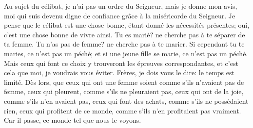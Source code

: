 Au sujet du célibat, je n’ai pas un ordre du Seigneur, mais je donne mon avis,
	moi qui suis devenu digne de confiance grâce à la miséricorde du Seigneur.
Je pense que le célibat est une chose bonne, étant donné les nécessités présentes;
	oui, c’est une chose bonne de vivre ainsi.
Tu es marié?
	ne cherche pas à te séparer de ta femme.
Tu n’as pas de femme?
	ne cherche pas à te marier.
Si cependant tu te maries, ce n’est pas un péché;
	et si une jeune fille se marie, ce n’est pas un péché.
Mais ceux qui font ce choix y trouveront les épreuves correspondantes,
	et c’est cela que moi, je voudrais vous éviter.
Frères, je dois vous le dire: le temps est limité.
Dès lors, que ceux qui ont une femme soient comme s’ils n’avaient pas de femme,
	ceux qui pleurent, comme s’ils ne pleuraient pas,
	ceux qui ont de la joie, comme s’ils n’en avaient pas,
	ceux qui font des achats, comme s’ils ne possédaient rien,
	ceux qui profitent de ce monde, comme s’ils n’en profitaient pas vraiment.
Car il passe, ce monde tel que nous le voyons.
